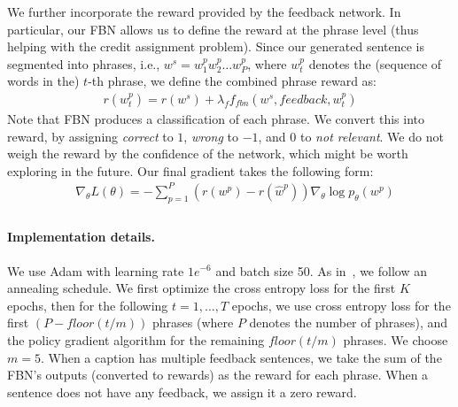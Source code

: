 We further incorporate the reward provided by the feedback network. In particular, our FBN allows us to define the reward at the phrase level (thus helping with the credit assignment problem). Since our generated sentence is segmented into phrases, i.e., $w^s = w^p_1w^p_2\dots w^p_P$, where $w^p_t$ denotes the (sequence of words in the) $t$-th phrase, we define the combined phrase reward as:
\begin{equation}
\begin{aligned}
&r(w^p_t) = r(w^s)+ \lambda_{f} f_{fbn}(w^s, feedback, w^p_t)
&
 \end{aligned}
\end{equation}
Note that FBN produces a classification of each phrase. We convert this into reward, by assigning \emph{correct} to $1$, \emph{wrong} to $-1$, and $0$ to \emph{not relevant}. We do not weigh the reward by the confidence of the network, which might be worth exploring in the future. 
Our final gradient takes the following form:
\begin{equation}
\begin{aligned}
&\nabla_{\theta} L(\theta) = - \sum_{p=1}^{P} (r(w^p) - r(\hat{w}^p)) \nabla_{\theta} \log p_\theta(w^p)\\
&
 \end{aligned}
\end{equation}

\vspace{-6.5mm}
\paragraph{Implementation details.}
We use Adam with learning rate $1e^{-6}$ and batch size 50. As in~\cite{Mixer}, we follow an annealing schedule.  
We first optimize the cross entropy loss for the first $K$ epochs, then for the following $t=1,\dots,T$ epochs, we use cross entropy loss for the first $(P - floor(t/m))$ phrases (where $P$ denotes the number of phrases), and the policy gradient algorithm for the remaining $floor(t/m)$ phrases. We choose $m = 5$. When a caption has multiple feedback sentences, we take the sum of the FBN's outputs (converted to rewards) as the reward for each phrase. When a sentence does not have any feedback, we assign it a zero reward.

\iffalse
In this section, we define a new reward function $r_H(w^s)$ ,which stands for reward from human feedback. we define $w^s = p_1p_2...p_k...p_K$ and $p_m$ stands for m-th phrase in generated sentence.\\As discussed in section3.3, we have $f(w^s, feedback, p_m)$.  Together with  section3.4, our final reward function is:\\
\begin{equation}
\begin{aligned}
&r(p_m) = \lambda_{1} BLEU_1(w^s)+\lambda_{2} BLEU_2(w^s)+ \lambda_{3} BLEU_3(w^s)+ \lambda_{4}BLEU_4(w^s) + \lambda_{5} f(w^s, feedback, p_m)
&
 \end{aligned}
\end{equation}
In particular, we choose $\lambda_{1}=\lambda_{2}=0.5$, $\lambda_{3}=\lambda_{4}=1$, $\lambda_{5}=0.3$.
\fi
